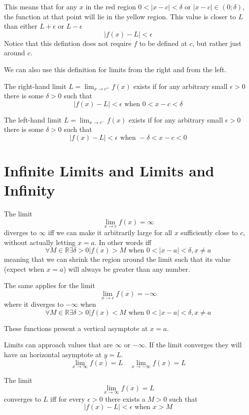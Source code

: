 \documentclass{article}
\begin{document}
This means that for any \(x\) in the red region \(0<|x-c|<\delta\text{ or }|x-c|\in (0; \delta)\),
the function at that point will lie in the yellow region.
This value is closer to \(L\) than either \(L + \epsilon\) or \(L - \epsilon\)
\[
    |f(x) - L| < \epsilon
\]
Notice that this defintion does not require \(f\) to be defined at \(c\), but rather just around \(c\).

We can also use this definition for limits from the right and from the left.

The right-hand limit \(L=\lim_{x\to c^{+}}f(x)\) exists if for any arbitrary small \(\epsilon > 0\)
there is some \(\delta > 0\) such that
\[
    |f(x)-L|<\epsilon \text{ when } 0 < x-c < \delta
\]

The left-hand limit \(L=\lim_{x\to c^{-}}f(x)\) exists if for any arbitrary small \(\epsilon > 0\)
there is some \(\delta > 0\) such that
\[
    |f(x)-L|<\epsilon \text{ when } -\delta < x-c < 0
\]

\pagebreak

\section{Infinite Limits and Limits and Infinity}

The limit
\[
    \lim_{x\to c}f(x) = \infty
\]
diverges to \(\infty\) iff we can make it arbitrarily large for all \(x\)
sufficiently close to \(c\), without actually letting \(x=a\).
In other words iff
\[
    \forall M \in \mathbb{R} \exists \delta > 0 | f(x) > M \text{ when } 0<|x-a|<\delta, x \neq a
\]
meaning that we can shrink the region around the limit such that its value (expect when \(x=a\))
will always be greater than any number.

The same applies for the limit
\[
    \lim_{x\to c}f(x) = -\infty
\]
where it diverges to \(-\infty\) when
\[
    \forall M \in \mathbb{R} \exists \delta > 0 | f(x) < M \text{ when } 0<|x-a|<\delta, x \neq a
\]

These functions present a vertical asymptote at \(x=a\).

Limits can approach values that are \(\infty\) or \(-\infty\).
If the limit converges they will have an horizontal asymptote at \(y=L\).
\[
    \lim_{x \to \infty} f(x) = L
    \quad
    \lim_{x \to -\infty} f(x) = L
\]

The limit
\[
    \lim_{x \to \infty} f(x)=L
\]
converges to \(L\) iff for every \(\epsilon > 0\) there exists a \(M > 0\) such that
\[
    |f(x)-L| < \epsilon \text{ when } x > M
\]
\end{document}
